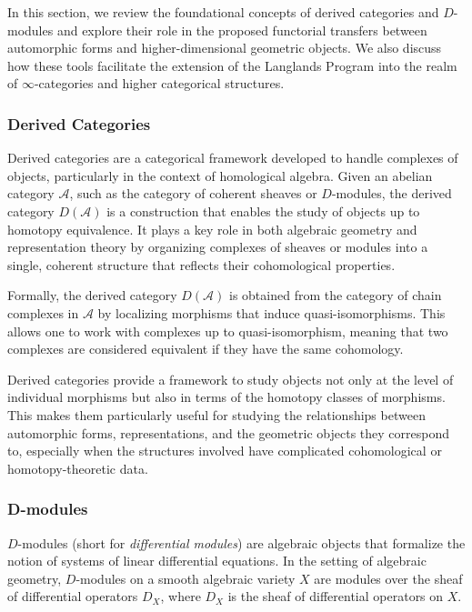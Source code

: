 \documentclass{article}
\theoremstyle{remark}
\begin{document}
In this section, we review the foundational concepts of derived categories and $D$-modules and explore their role in the proposed functorial transfers between automorphic forms and higher-dimensional geometric objects. We also discuss how these tools facilitate the extension of the Langlands Program into the realm of $\infty$-categories and higher categorical structures.

\subsubsection{Derived Categories}

Derived categories are a categorical framework developed to handle complexes of objects, particularly in the context of homological algebra. Given an abelian category $\mathcal{A}$, such as the category of coherent sheaves or $D$-modules, the derived category $D(\mathcal{A})$ is a construction that enables the study of objects up to homotopy equivalence. It plays a key role in both algebraic geometry and representation theory by organizing complexes of sheaves or modules into a single, coherent structure that reflects their cohomological properties.

Formally, the derived category $D(\mathcal{A})$ is obtained from the category of chain complexes in $\mathcal{A}$ by localizing morphisms that induce quasi-isomorphisms. This allows one to work with complexes up to quasi-isomorphism, meaning that two complexes are considered equivalent if they have the same cohomology.

Derived categories provide a framework to study objects not only at the level of individual morphisms but also in terms of the homotopy classes of morphisms. This makes them particularly useful for studying the relationships between automorphic forms, representations, and the geometric objects they correspond to, especially when the structures involved have complicated cohomological or homotopy-theoretic data.

\subsubsection{D-modules}

$D$-modules (short for \emph{differential modules}) are algebraic objects that formalize the notion of systems of linear differential equations. In the setting of algebraic geometry, $D$-modules on a smooth algebraic variety $X$ are modules over the sheaf of differential operators $D_X$, where $D_X$ is the sheaf of differential operators on $X$.
\end{document}

